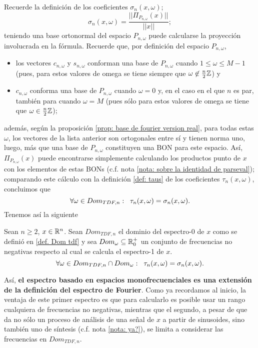Recuerde la definición de los coeficientes
$\sigma_{n}(x, \omega)$;
\[
\sigma_{n}(x, \omega) = \frac{|| \Pi_{P_{n, \omega}}(x) ||}{|| x ||};
\]
teniendo una base ortonormal del espacio 
$P_{n, \omega}$ puede calcularse la proyección involucrada en la fórmula.
Recuerde que, por definición del espacio $P_{n, \omega}$,
\begin{itemize}
	\item los vectores $c_{n, \omega}$ y $s_{n, \omega}$ conforman
	una base de $P_{n, \omega}$ cuando $1 \leq \omega \leq M-1$ 
	(pues, para estos valores de omega se tiene siempre
	que $\omega \not\in \frac{n}{2} \mathbb{Z}$) y
	\item $c_{n, \omega}$ conforma una base 
	de $P_{n, \omega}$ cuando $\omega = 0$ y,
	en el caso en el que $n$ es par, también para cuando $\omega = M$
	(pues sólo para estos valores de omega se tiene 
	que $\omega \in \frac{n}{2} \mathbb{Z}$);
\end{itemize}
además, según la proposición
\ref{prop: base de fourier version real},
para todas estas $\omega$,
los vectores de la lista anterior son ortogonales entre
sí y tienen norma uno, luego, más que una base de 
$P_{n, \omega}$ constituyen una BON para este espacio.
Así, $\Pi_{P_{n, \omega}}(x)$ puede encontrarse 
simplemente calculando los productos punto 
de $x$ con los elementos de estas BONs (c.f. 
nota \ref{nota: sobre la identidad de parseval});
comparando este cálculo con la definición 
\ref{def: taus}
de los coeficientes $\tau_{n}(x, \omega)$, concluimos que
\begin{equation}
\label{eq4: 4May}
\forall \omega \in Dom_{TDF, n}: \hspace{0.2cm}
\tau_{n}(x, \omega) = \sigma_{n}(x, \omega).
\end{equation}
Tenemos así la siguiente

\begin{prop}
\label{prop: coinciden espectr}
Sean $n \geq 2$, $x \in \mathbb{R}^{n}$.
Sean $Dom_{TDF, n}$ el dominio del espectro-0 de $x$
como se definió en \ref{def. Dom tdf} y sea $Dom_{\omega} \subseteq \mathbb{R}^{+}_{0}$
un conjunto de frecuencias no negativas respecto al cual se calcula
el espectro-1 de $x$.
\[
\forall \omega \in Dom_{TDF, n} \cap Dom_{\omega}:
\hspace{0.2cm} \tau_{n}(x, \omega) = \sigma_{n}(x, \omega).
\]
\end{prop}

Así, \textbf{el espectro basado en espacios monofrecuenciales
es una extensión de la definición del espectro de Fourier}.
Como ya recordamos al inicio, la
ventaja de este primer espectro es que para calcularlo es posible usar
un rango cualquiera de frecuencias no negativas, mientras que el segundo, 
a pesar de que da no sólo un proceso de análisis de una señal 
de $x$ a partir de sinusoides, sino también uno de síntesis
(c.f. nota \ref{nota: ya?}), se limita a considerar las frecuencias 
en $Dom_{TDF, n}$.


